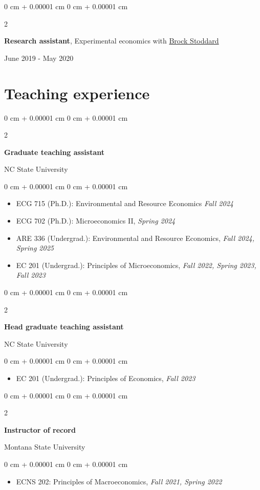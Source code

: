\documentclass[11pt]{article}
\newenvironment{highlights}{
	\begin{itemize}[
		topsep=0.10 cm,
		parsep=0.10 cm,
		partopsep=0pt,
		itemsep=0pt,
		leftmargin=0 cm + 10pt
		]
	}{
	\end{itemize}
} %
\newenvironment{onecolentry}{
	\begin{adjustwidth}{
			0 cm + 0.00001 cm
		}{
			0 cm + 0.00001 cm
		}
	}{
	\end{adjustwidth}
} %
\newenvironment{twocolentry}[2][]{
	\onecolentry
	\def\secondColumn{#2}
	\setcolumnwidth{\fill, 4.5 cm}
	\begin{paracol}{2}
	}{
		\switchcolumn \raggedleft \secondColumn
	\end{paracol}
	\endonecolentry
} %
\begin{document}
\vspace{0.10 cm}

\begin{twocolentry}{June 2019 - May 2020}
	\textbf{Research assistant},
	Experimental economics with \href{https://sites.google.com/a/appstate.edu/brock_stoddard/home}{Brock Stoddard}
\end{twocolentry}


\section{Teaching experience}


\begin{twocolentry}{NC State University}
	\textbf{Graduate teaching assistant}
\end{twocolentry}
\begin{onecolentry}
	\begin{highlights}
		\item ECG 715 (Ph.D.): Environmental and Resource Economics \textit{Fall 2024}
		\item ECG 702 (Ph.D.): Microeconomics II, \textit{Spring 2024}
		\item ARE 336 (Undergrad.): Environmental and Resource Economics, \textit{Fall 2024, Spring 2025}
		\item EC 201 (Undergrad.): Principles of Microeconomics, \textit{Fall 2022, Spring 2023, Fall 2023}
	\end{highlights}
\end{onecolentry}

\vspace{0.10 cm}

\begin{twocolentry}{NC State University}
	\textbf{Head graduate teaching assistant}
\end{twocolentry}
\begin{onecolentry}
	\begin{highlights}
		\item EC 201 (Undergrad.): Principles of Economics, \textit{Fall 2023}
	\end{highlights}
\end{onecolentry}

\vspace{0.10 cm}

\begin{twocolentry}{Montana State University}
	\textbf{Instructor of record}
\end{twocolentry}
\begin{onecolentry}
	\begin{highlights}
		\item ECNS 202: Principles of Macroeconomics, \textit{Fall 2021, Spring 2022}
	\end{highlights}
\end{onecolentry}
\end{document}
